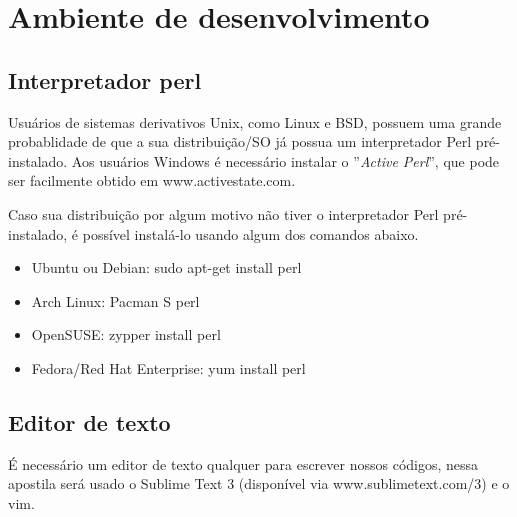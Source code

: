 \chapter{Ambiente de desenvolvimento}
 
\section{Interpretador perl} 
Usu\'arios de sistemas derivativos Unix, como Linux e BSD, possuem uma grande probablidade de que a sua distribui\c{c}\~ao/SO j\'a possua um interpretador 
Perl pr\'e-instalado. Aos usu\'arios Windows \'e necess\'ario instalar o ''\textit{Active Perl}'', que pode ser facilmente obtido em www.activestate.com. 
 
Caso sua distribui\c{c}\~ao por algum motivo n\~ao tiver o interpretador Perl pr\'e-instalado, \'e poss\'ivel instal\'a-lo usando algum dos comandos abaixo. 

\begin{itemize}
    \item{Ubuntu ou Debian: sudo apt-get install perl}
    \item{Arch Linux: Pacman S perl}
    \item{OpenSUSE: zypper install perl}
    \item{Fedora/Red Hat Enterprise: yum install perl}
\end{itemize}

\section{Editor de texto}  
\'E necess\'ario um editor de texto qualquer para escrever nossos c\'odigos, nessa apostila ser\'a usado o Sublime Text 3 
(dispon\'ivel via www.sublimetext.com/3) e o vim. 